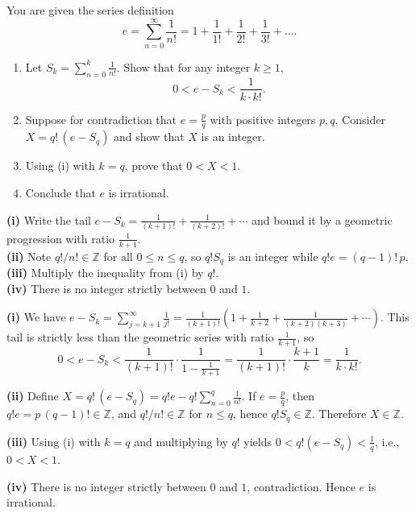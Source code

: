 \begin{problem}
You are given the series definition
\[ e = \sum_{n=0}^{\infty} \frac{1}{n!} = 1 + \frac{1}{1!} + \frac{1}{2!} + \frac{1}{3!} + \dots. \]

\begin{enumerate}
    \item[(i)] Let $S_k = \sum_{n=0}^{k} \frac{1}{n!}$. Show that for any integer $k\ge 1$,
    \[ 0 < e - S_k < \frac{1}{k\cdot k!}. \]

    \item[(ii)] Suppose for contradiction that $e=\tfrac{p}{q}$ with positive integers $p,q$. Consider $X = q!\,(e - S_q)$ and show that $X$ is an integer.

    \item[(iii)] Using (i) with $k=q$, prove that $0 < X < 1$.

    \item[(iv)] Conclude that $e$ is irrational.
\end{enumerate}

\begin{hint}
	\textbf{(i)} Write the tail $e-S_k=\tfrac{1}{(k+1)!}+\tfrac{1}{(k+2)!}+\cdots$ and bound it by a geometric progression with ratio $\tfrac{1}{k+1}$.\\
	\textbf{(ii)} Note $q!/n!\in\mathbb{Z}$ for all $0\le n\le q$, so $q!S_q$ is an integer while $q!e= (q-1)!\,p$.\\
	\textbf{(iii)} Multiply the inequality from (i) by $q!$.\\
	\textbf{(iv)} There is no integer strictly between $0$ and $1$.
\end{hint}
\end{problem}

\begin{solution}
    \textbf{(i)} We have $e-S_k=\sum_{j=k+1}^{\infty}\tfrac{1}{j!}=\tfrac{1}{(k+1)!}\left(1+\tfrac{1}{k+2}+\tfrac{1}{(k+2)(k+3)}+\cdots\right)$. This tail is strictly less than the geometric series with ratio $\tfrac{1}{k+1}$, so
\[ 0<e-S_k<\frac{1}{(k+1)!}\cdot\frac{1}{1-\tfrac{1}{k+1}}=\frac{1}{(k+1)!}\cdot\frac{k+1}{k}=\frac{1}{k\cdot k!}. \]

    \textbf{(ii)} Define $X=q!\,(e-S_q)=q!e- q!\sum_{n=0}^q\tfrac{1}{n!}$. If $e=\tfrac{p}{q}$, then $q!e=p\,(q-1)!\in\mathbb{Z}$, and $q!/n!\in\mathbb{Z}$ for $n\le q$, hence $q!S_q\in\mathbb{Z}$. Therefore $X\in\mathbb{Z}$.

    \textbf{(iii)} Using (i) with $k=q$ and multiplying by $q!$ yields $0<q!(e-S_q)<\tfrac{1}{q}$, i.e., $0<X<1$.

    \textbf{(iv)} There is no integer strictly between $0$ and $1$, contradiction. Hence $e$ is irrational.
\end{solution}

